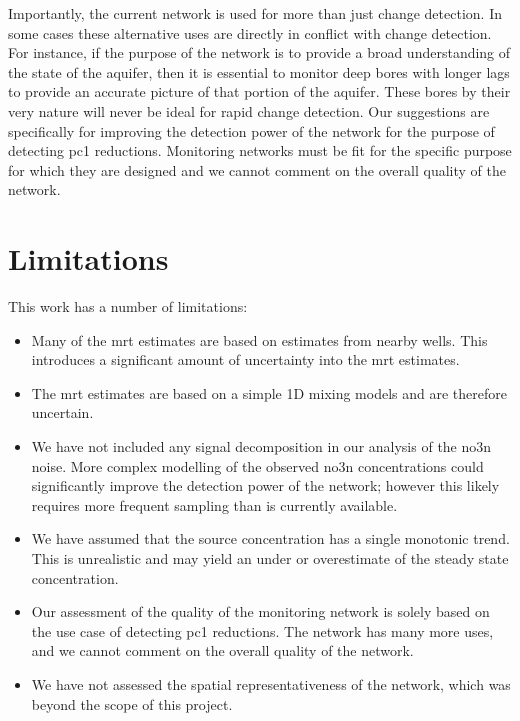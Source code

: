 Importantly, the current network is used for more than just change detection.
In some cases these alternative uses are directly in conflict with change detection.
For instance, if the purpose of the network is to provide a broad understanding of the state of the aquifer, then it is essential to monitor deep bores with longer lags to provide an accurate picture of that portion of the aquifer.
These bores by their very nature will never be ideal for rapid change detection.
Our suggestions are specifically for improving the detection power of the network for the purpose of detecting \gls{pc1} reductions.
Monitoring networks must be fit for the specific purpose for which they are designed and we cannot comment on the overall quality of the network.

\section[Limitations]{Limitations}

This work has a number of limitations:
\begin{itemize}
    \item Many of the \gls{mrt} estimates are based on estimates from nearby wells. This introduces a significant amount of uncertainty into the \gls{mrt} estimates.
    \item The \gls{mrt} estimates are based on a simple 1D mixing models and are therefore uncertain.
    \item We have not included any signal decomposition in our analysis of the \gls{no3n} noise. More complex modelling of the observed \gls{no3n} concentrations could significantly improve the detection power of the network; however this likely requires more frequent sampling than is currently available.
    \item We have assumed that the source concentration has a single monotonic trend. This is unrealistic and may yield an under or overestimate of the steady state concentration.
    \item Our assessment of the quality of the monitoring network is solely based on the use case of detecting \gls{pc1} reductions. The network has many more uses, and we cannot comment on the overall quality of the network.
    \item We have not assessed the spatial representativeness of the network, which was beyond the scope of this project.
\end{itemize}
